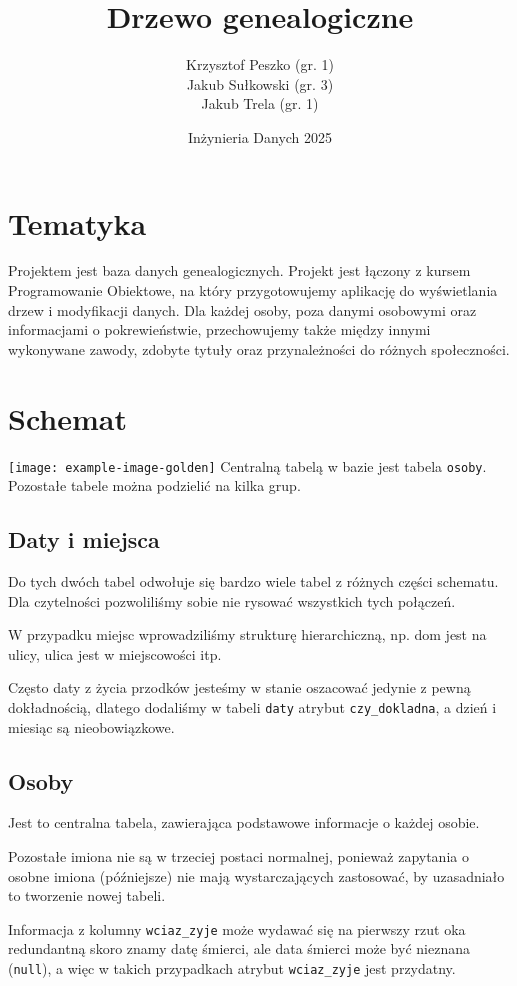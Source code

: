 \documentclass{article}
\title{Drzewo genealogiczne}
\author{Krzysztof Peszko (gr. 1) \\
Jakub Sułkowski (gr. 3) \\ Jakub Trela (gr. 1)}
\date{Inżynieria Danych 2025}
\begin{document}
\maketitle

\section{Tematyka}
Projektem jest baza danych genealogicznych. Projekt jest łączony z kursem Programowanie Obiektowe, na który przygotowujemy aplikację do wyświetlania drzew i modyfikacji danych. Dla każdej osoby, poza danymi osobowymi oraz informacjami o pokrewieństwie, przechowujemy także między innymi wykonywane zawody, zdobyte tytuły oraz przynależności do różnych społeczności.

\section{Schemat}
\texttt{[image: example-image-golden]}
Centralną tabelą w bazie jest tabela \texttt{osoby}. Pozostałe tabele można podzielić na kilka grup.

\subsection{Daty i miejsca}
Do tych dwóch tabel odwołuje się bardzo wiele tabel z różnych części schematu. Dla czytelności pozwoliliśmy sobie nie rysować wszystkich tych połączeń.

W przypadku miejsc wprowadziliśmy strukturę hierarchiczną, np. dom jest na ulicy, ulica jest w miejscowości itp.

Często daty z życia przodków jesteśmy w stanie oszacować jedynie z pewną dokładnością, dlatego dodaliśmy w tabeli \texttt{daty} atrybut \texttt{czy\_dokladna}, a dzień i miesiąc są nieobowiązkowe.

\subsection{Osoby}
Jest to centralna tabela, zawierająca podstawowe informacje o każdej osobie.

Pozostałe imiona nie są w trzeciej postaci normalnej, ponieważ zapytania o osobne imiona (późniejsze) nie mają wystarczających zastosować, by uzasadniało to tworzenie nowej tabeli.

Informacja z kolumny \texttt{wciaz\_zyje} może wydawać się na pierwszy rzut oka redundantną skoro znamy datę śmierci, ale data śmierci może być nieznana (\texttt{null}), a więc w takich przypadkach atrybut \texttt{wciaz\_zyje} jest przydatny.
\end{document}
